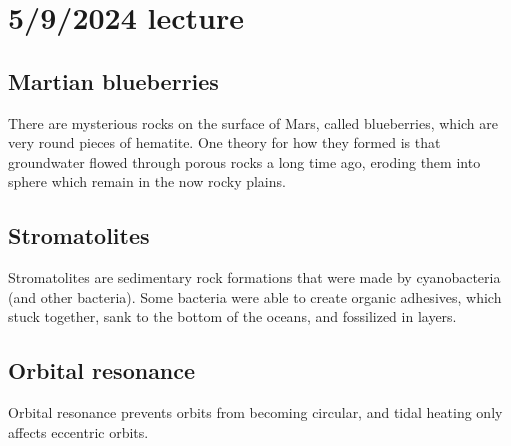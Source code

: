 \documentclass[class=article, crop=false]{standalone}
\begin{document}
\section{5/9/2024 lecture}
\subsection{Martian blueberries}
There are mysterious rocks on the surface of Mars, called blueberries, which are very round pieces of hematite. One theory for how they formed is that groundwater flowed through porous rocks a long time ago, eroding them into sphere which remain in the now rocky plains.
\subsection{Stromatolites}
Stromatolites are sedimentary rock formations that were made by cyanobacteria (and other bacteria). Some bacteria were able to create organic adhesives, which stuck together, sank to the bottom of the oceans, and fossilized in layers.
\subsection{Orbital resonance}
Orbital resonance prevents orbits from becoming circular, and tidal heating only affects eccentric orbits.
\end{document}
